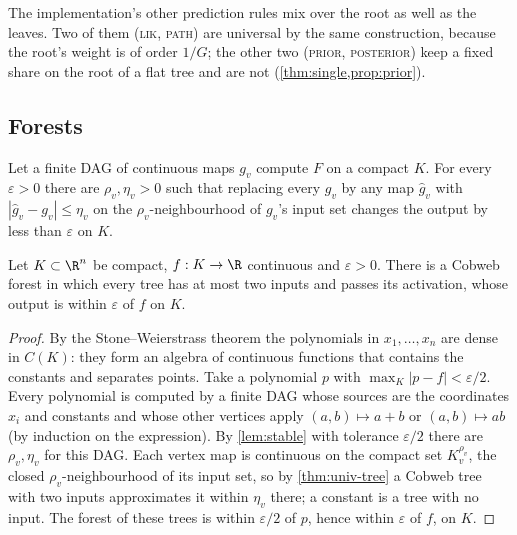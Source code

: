 The implementation's other prediction rules mix over the root as well as the leaves.
Two of them (\textsc{lik}, \textsc{path}) are universal by the same construction, because
the root's weight is of order $1/G$; the other two (\textsc{prior}, \textsc{posterior})
keep a fixed share on the root of a flat tree and are not (\cref{thm:single,prop:prior}).

\subsection{Forests}

\begin{lemma}\label{lem:stable}
Let a finite DAG of continuous maps $g_v$ compute $F$ on a compact $K$.  For every
$\varepsilon>0$ there are $\rho_v,\eta_v>0$ such that replacing every $g_v$ by any map
$\hat g_v$ with $|\hat g_v-g_v|\le\eta_v$ on the $\rho_v$-neighbourhood of $g_v$'s input set
changes the output by less than $\varepsilon$ on $K$.
\end{lemma}

\begin{theorem}\label{thm:univ-forest}
Let $K\subset\R^n$ be compact, $f:K\to\R$ continuous and $\varepsilon>0$.  There is a
Cobweb forest in which every tree has at most two inputs and passes its activation, whose
output is within $\varepsilon$ of $f$ on $K$.
\end{theorem}

\begin{proof}
By the Stone--Weierstrass theorem \citep{stone1948} the polynomials in $x_1,\dots,x_n$
are dense in $C(K)$: they form an algebra of continuous functions that contains the
constants and separates points.  Take a polynomial $p$ with $\max_K|p-f|<\varepsilon/2$.
Every polynomial is computed by a finite DAG whose sources are the coordinates $x_i$ and
constants and whose other vertices apply $(a,b)\mapsto a+b$ or $(a,b)\mapsto ab$ (by
induction on the expression).  By \cref{lem:stable} with tolerance $\varepsilon/2$ there
are $\rho_v,\eta_v$ for this DAG.  Each vertex map is continuous on the compact set
$K_v^{\rho_v}$, the closed $\rho_v$-neighbourhood of its input set, so by
\cref{thm:univ-tree} a Cobweb tree with two inputs approximates it within $\eta_v$ there;
a constant is a tree with no input.  The forest of these trees is within $\varepsilon/2$ of
$p$, hence within $\varepsilon$ of $f$, on $K$.
\end{proof}

